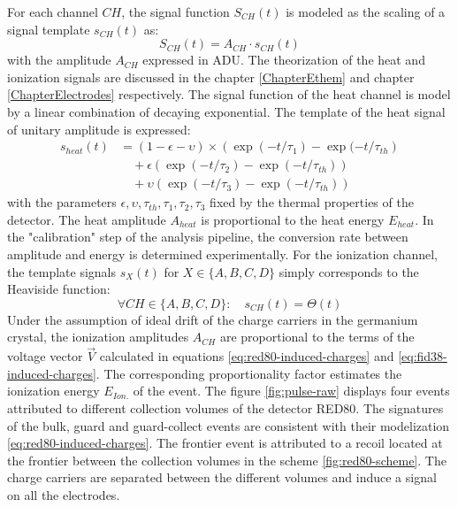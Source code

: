 For each channel $CH$, the signal function $S_{CH}(t)$ is modeled as the scaling of a signal template $s_{CH}(t)$ as:
\begin{equation}
S_{CH}(t) = A_{CH} \cdot s_{CH}(t)
\end{equation}
with the amplitude $A_{CH}$ expressed in ADU.
The theorization of the heat and ionization signals are discussed in the chapter \ref{ChapterEthem} and chapter \ref{ChapterElectrodes} respectively. The signal function of the heat channel is model by a linear combination of decaying exponential. The template of the heat signal of unitary amplitude is expressed:
\begin{equation}
\label{eq:heat-channel-signal-function}
\begin{split}
s_{heat}(t)
&=
(1 - \epsilon - \upsilon) \times \left( \exp(-t/\tau_{1}) - \exp(-t/\tau_{th} \right)
\\
& \quad +
\epsilon \left( \exp(-t/\tau_{2}) - \exp(-t/\tau_{th}) \right)
\\
& \quad +
\upsilon \left( \exp(-t/\tau_{3}) - \exp(-t/\tau_{th}) \right)
\end{split}
\end{equation}
with the parameters $\epsilon, \upsilon, \tau_{th}, \tau_1, \tau_2, \tau_3$ fixed by the thermal properties of the detector. The heat amplitude $A_{heat}$ is proportional to the heat energy $E_{heat}$. In the "calibration" step of the analysis pipeline, the conversion rate between amplitude and energy is determined experimentally. 
For the ionization channel, the template signals $s_{X}(t)$ for $X \in \{A,B,C,D\}$ simply corresponds to the Heaviside function:
\begin{equation}
\label{eq:ionization-channel-signal-function}
\forall CH \in \{A,B,C,D\}: \quad s_{CH}(t) = \Theta(t)
\end{equation}
Under the assumption of ideal drift of the charge carriers in the germanium crystal, the ionization amplitudes $A_{CH}$ are proportional to the terms of the voltage vector $\vec{V}$ calculated in equations \ref{eq:red80-induced-charges} and \ref{eq:fid38-induced-charges}. The corresponding proportionality factor estimates the ionization energy $E_{Ion.}$ of the event. The figure \ref{fig:pulse-raw} displays four events attributed to different collection volumes of the detector RED80. The signatures of the bulk, guard and guard-collect events are consistent with their modelization \ref{eq:red80-induced-charges}. The frontier event is attributed to a recoil located at the frontier between the collection volumes in the scheme \ref{fig:red80-scheme}. The charge carriers are separated between the different volumes and induce a signal on all the electrodes.


